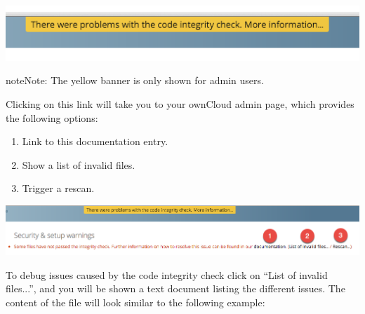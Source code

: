 \documentclass[letterpaper,10pt,english]{sphinxmanual}
\begin{document}
\includegraphics{code-integrity-notification.png}

\begin{notice}{note}{Note:}
The yellow banner is only shown for admin users.
\end{notice}

Clicking on this link will take you to your ownCloud admin page, which provides
the following options:
\begin{enumerate}
\item {} 
Link to this documentation entry.

\item {} 
Show a list of invalid files.

\item {} 
Trigger a rescan.

\end{enumerate}

\includegraphics{code-integrity-admin.png}

To debug issues caused by the code integrity check click on ``List of invalid
files...'', and you will be shown a text document listing the different issues. The
content of the file will look similar to the following example:
\end{document}
